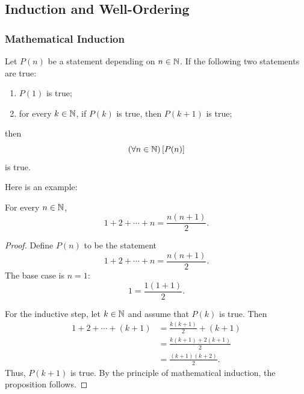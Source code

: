 
\subsection{Induction and Well-Ordering}
\subsubsection{Mathematical Induction}
\begin{definition}\label{def:induction}
    Let $P(n)$ be a statement depending on $n\in\mathbb{N}$. If the following two statements are true:
    \begin{enumerate}[label=(\arabic*)]
        \item $P(1)$ is true;
        \item for every $k\in\mathbb{N}$, if $P(k)$ is true, then $P(k+1)$ is true;
    \end{enumerate}
    then
    \begin{equation*}
        (\forall n\in\mathbb{N})\,[P(n)]
    \end{equation*}
    is true.
\end{definition}


Here is an example: 
\begin{proposition}\label{prop:sum-n}
    For every $n\in\mathbb{N}$,
    \begin{equation*}
        1+2+\cdots+n=\frac{n(n+1)}{2}.
    \end{equation*}
\end{proposition}


\begin{proof}
    Define $P(n)$ to be the statement
    \begin{equation*}
        1+2+\cdots+n=\frac{n(n+1)}{2}.
    \end{equation*}
    The base case is $n=1$:
    \begin{equation*}
        1=\frac{1(1+1)}{2}.
    \end{equation*}

    For the inductive step, let $k\in\mathbb{N}$ and assume that $P(k)$ is true. Then
    \begin{align*}
        1+2+\cdots+(k+1)
            &= \frac{k(k+1)}{2}+(k+1) \\
            &= \frac{k(k+1)+2(k+1)}{2} \\
            &= \frac{(k+1)(k+2)}{2}.
    \end{align*}
    Thus, $P(k+1)$ is true. By the principle of mathematical induction, the proposition follows.
\end{proof}

